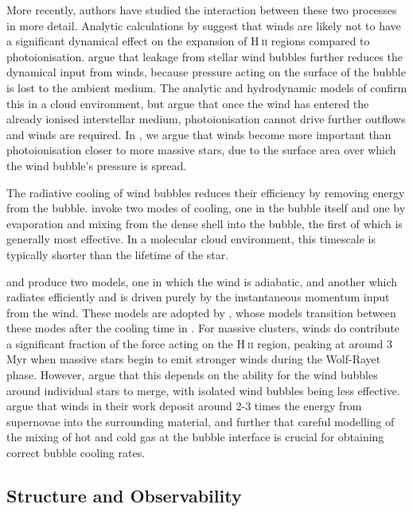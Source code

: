 \documentclass[a4paper,fleqn,usenatbib]{mnras}
\newcommand{\HII}{H$~$\textsc{ii}\xspace}
\begin{document}
More recently, authors have studied the interaction between these two processes in more detail. Analytic calculations by \cite{Capriotti2001} suggest that winds are likely not to have a significant dynamical effect on the expansion of \HII regions compared to photoionisation. \cite{Krumholz2009} argue that leakage from stellar wind bubbles further reduces the dynamical input from winds, because pressure acting on the surface of the bubble is lost to the ambient medium. The analytic and hydrodynamic models of \cite{Haid2018} confirm this in a cloud environment, but argue that once the wind has entered the already ionised interstellar medium, photoionisation cannot drive further outflows and winds are required. In \cite{Geen2019}, we argue that winds become more important than photoionisation closer to more massive stars, due to the surface area over which the wind bubble's pressure is spread.

The radiative cooling of wind bubbles reduces their efficiency by removing energy from the bubble. \cite{MacLow1988} invoke two modes of cooling, one in the bubble itself and one by evaporation and mixing from the dense shell into the bubble, the first of which is generally most effective. In a molecular cloud environment, this timescale is typically shorter than the lifetime of the star. 

\cite{Silich2013} and \cite{Silich2018} produce two models, one in which the wind is adiabatic, and another which radiates efficiently and is driven purely by the instantaneous momentum input from the wind. These models are adopted by \cite{Rahner2017}, whose models transition between these modes after the cooling time in \cite{MacLow1988}. For massive clusters, winds do contribute a significant fraction of the force acting on the \HII region, peaking at around 3 Myr when massive stars begin to emit stronger winds during the Wolf-Rayet phase. However, \cite{Silich2017} argue that this depends on the ability for the wind bubbles around individual stars to merge, with isolated wind bubbles being less effective. \cite{Fierlinger2016} argue that winds in their work deposit around 2-3 times the energy from supernovae into the surrounding material, and further that careful modelling of the mixing of hot and cold gas at the bubble interface is crucial for obtaining correct bubble cooling rates.

\subsection{Structure and Observability}
\end{document}
